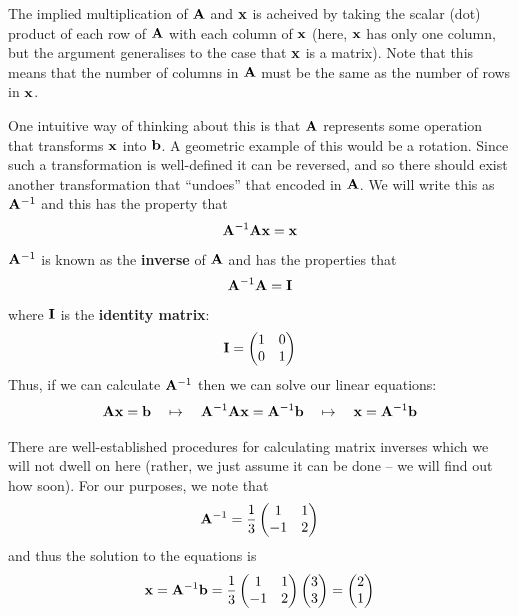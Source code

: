 \documentclass[12pt,a4paper]{tufte-handout}
\begin{document}
The implied multiplication of $\mathbf{A}$ and $\mathbf{x}$ is acheived by taking the scalar (dot) product of each row of $\mathbf{A}$ with each column of $\mathbf{x}$ (here, $\mathbf{x}$ has only one column, but the argument generalises to the case that $\mathbf{x}$ is a matrix). Note that this means that the number of columns in $\mathbf{A}$ must be the same as the number of rows in $\mathbf{x}$.

One intuitive way of thinking about this is that $\mathbf{A}$ represents some operation that transforms $\mathbf{x}$ into $\mathbf{b}$. A geometric example of this would be a rotation. Since such a transformation is well-defined it can be reversed, and so there should exist another transformation that ``undoes'' that encoded in $\mathbf{A}$. We will write this as $\mathbf{A}^{-1}$ and this has the property that
\begin{equation}
  \mathbf{A}^{-1}\mathbf{A}\mathbf{x} = \mathbf{x}
\end{equation}
$\mathbf{A}^{-1}$ is known as the \textbf{inverse} of $\mathbf{A}$ and has the properties that
\begin{equation}
  \mathbf{A}^{-1}\mathbf{A}=\mathbf{I}
\end{equation}
where $\mathbf{I}$ is the \textbf{identity matrix}:
\begin{equation}
  \mathbf{I} = \begin{pmatrix}1 & 0 \\0 & 1\end{pmatrix}
\end{equation}
Thus, if we can calculate $\mathbf{A}^{-1}$ then we can solve our linear equations:
\begin{equation}
  \mathbf{A}\mathbf{x}=\mathbf{b} \quad\mapsto\quad \mathbf{A}^{-1}\mathbf{A}\mathbf{x}=\mathbf{A}^{-1}\mathbf{b} \quad\mapsto\quad \mathbf{x} = \mathbf{A}^{-1}\mathbf{b}
\end{equation}

There are well-established procedures for calculating matrix inverses which we will not dwell on here (rather, we just assume it can be done -- we will find out how soon). For our purposes, we note that
\begin{equation}
  \mathbf{A}^{-1} = \frac{1}{3}\begin{pmatrix}1&1\\-1&2\end{pmatrix}
\end{equation}
and thus the solution to the equations is
\begin{equation}
\mathbf{x} = \mathbf{A}^{-1}\mathbf{b} = \frac{1}{3}\begin{pmatrix}1&1\\-1&2\end{pmatrix}\begin{pmatrix}3\\3\end{pmatrix} = \begin{pmatrix}2\\1\end{pmatrix}
\end{equation}
\end{document}
